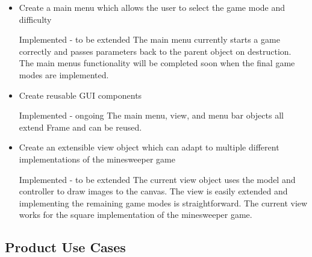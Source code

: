 \documentclass[12pt, a4]{report}
\begin{document}
\begin{itemize}
	\item Create a main menu which allows the user to select the game mode and difficulty
	\par \textcolor{fawn}{Implemented - to be extended \textbar{} } The main menu currently starts a game correctly and passes parameters back to the parent object on destruction. The main menus functionality will be completed soon when the final game modes are implemented.

	\item Create reusable GUI components
	\par \textcolor{codegreen}{Implemented - ongoing \textbar{} } The main menu, view, and menu bar objects all extend Frame and can be reused.

	\item Create an extensible view object which can adapt to multiple different implementations of the minesweeper game
	\par \textcolor{fawn}{Implemented - to be extended \textbar{} } The current view object uses the model and controller to draw images to the canvas. The view is easily extended and implementing the remaining game modes is straightforward. The current view works for the square implementation of the minesweeper game.
\end{itemize}

\subsection{Product Use Cases}
\par 
\end{document}
